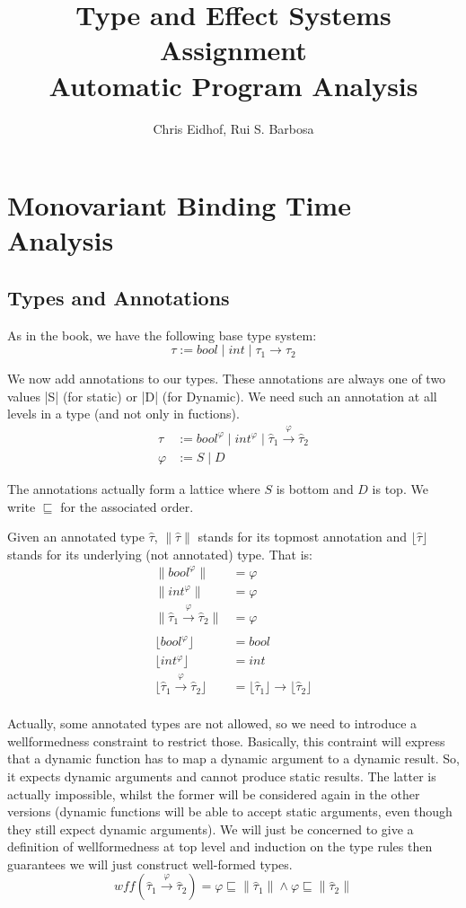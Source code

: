 \documentclass[a4wide,12pt]{article}
\theoremstyle{definition}
\theoremstyle{plain}
\theoremstyle{remark}
\def\sqleq{\sqsubseteq}
\def\htau{\hat{\tau}}
\def\annot#1{\|#1\|}
\def\baset#1{\lfloor#1\rfloor}
\begin{document}
\author{Chris Eidhof, Rui S. Barbosa}
\title{Type and Effect Systems Assignment \\ Automatic Program Analysis}
 
\maketitle

\section{Monovariant Binding Time Analysis}

\subsection{Types and Annotations}
As in the book, we have the following base type system:
\[\tau := bool\; |\; int\; | \;\tau_1 \to \tau_2\]

We  now add annotations to our types. These annotations are always
one of two values |S| (for static) or |D| (for Dynamic). 
We need such an annotation
at all levels in a type (and not only in fuctions).
\begin{eqnarray*}
\htau & := bool^\varphi\; |\; int^\varphi\; |\; \htau_1 \overset{\varphi}{\to} \htau_2 
\\
\varphi & := S\; |\; D
\end{eqnarray*}

The annotations actually form a lattice where $S$ is bottom and  $D$ is top. We write $\sqleq$ for
the associated order. 

Given an annotated type $\htau$, $\annot{\htau}$ stands for its topmost annotation
and $\baset{\htau}$ stands for its underlying (not annotated) type. That is:
\begin{eqnarray*}
\annot{bool^\varphi} & = \varphi \\
\annot{int^\varphi} & = \varphi \\
\annot{\htau_1 \overset{\varphi}{\to} \htau_2} & = \varphi \\
\\
\baset{bool^\varphi} & = bool \\
\baset{int^\varphi} & = int \\
\baset{\htau_1 \overset{\varphi}{\to} \htau_2} & = \baset{\htau_1} \to \baset{\htau_2} \\
\end{eqnarray*}


Actually, some annotated types are not allowed, so we need to introduce a wellformedness
constraint to restrict those. Basically, this contraint will express that a dynamic function
has to map a dynamic argument to a dynamic result. So, it 
expects dynamic arguments and cannot produce static results. The latter is actually
impossible, whilst the former will be considered again in the other versions
(dynamic functions will be able to accept static arguments, even though they still expect dynamic arguments).
We will just be concerned to give a definition of wellformedness at top level and
induction on the type rules then guarantees we will just construct
well-formed types.
\[
wff(\htau_1 \overset{\varphi}{\to} \htau_2) 
= \varphi \sqleq \annot{\htau_1}
 \land   \varphi \sqleq \annot{\htau_2}
\]
\end{document}
